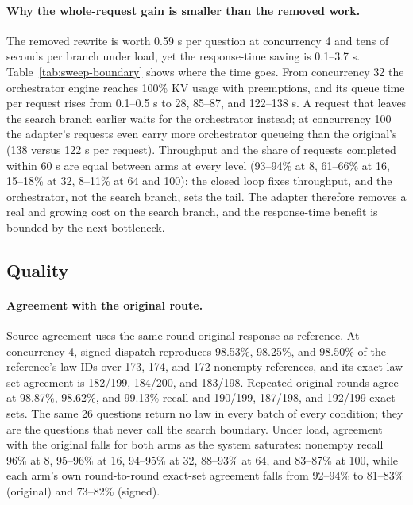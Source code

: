 \documentclass[paper]{ieice}
\begin{document}
\paragraph{Why the whole-request gain is smaller than the removed work.}
The removed rewrite is worth 0.59 s per question at concurrency 4 and tens of seconds per branch under load, yet the response-time saving is 0.1--3.7 s. Table~\ref{tab:sweep-boundary} shows where the time goes. From concurrency 32 the orchestrator engine reaches 100\% KV usage with preemptions, and its queue time per request rises from 0.1--0.5 s to 28, 85--87, and 122--138 s. A request that leaves the search branch earlier waits for the orchestrator instead; at concurrency 100 the adapter's requests even carry more orchestrator queueing than the original's (138 versus 122 s per request). Throughput and the share of requests completed within 60 s are equal between arms at every level (93--94\% at 8, 61--66\% at 16, 15--18\% at 32, 8--11\% at 64 and 100): the closed loop fixes throughput, and the orchestrator, not the search branch, sets the tail. The adapter therefore removes a real and growing cost on the search branch, and the response-time benefit is bounded by the next bottleneck.

\subsection{Quality}
\paragraph{Agreement with the original route.}
Source agreement uses the same-round original response as reference. At concurrency 4, signed dispatch reproduces 98.53\%, 98.25\%, and 98.50\% of the reference's law IDs over 173, 174, and 172 nonempty references, and its exact law-set agreement is 182/199, 184/200, and 183/198. Repeated original rounds agree at 98.87\%, 98.62\%, and 99.13\% recall and 190/199, 187/198, and 192/199 exact sets. The same 26 questions return no law in every batch of every condition; they are the questions that never call the search boundary. Under load, agreement with the original falls for both arms as the system saturates: nonempty recall 96\% at 8, 95--96\% at 16, 94--95\% at 32, 88--93\% at 64, and 83--87\% at 100, while each arm's own round-to-round exact-set agreement falls from 92--94\% to 81--83\% (original) and 73--82\% (signed).
\end{document}
